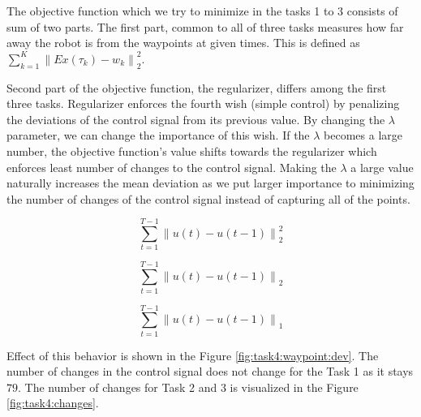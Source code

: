 The objective function which we try to minimize in the tasks 1 to 3 consists of sum of two parts. The first part, common to all of three tasks measures how far away the robot is from the waypoints at given times. This is defined as $\sum_{k = 1}^K \left\| E x( \tau_k ) - w_k \right\|_2^2$. 

Second part of the objective function, the regularizer, differs among the first three tasks. Regularizer enforces the fourth wish (simple control) by penalizing the deviations of the control signal from its previous value. By changing the $\lambda$ parameter, we can change the importance of this wish. If the $\lambda$ becomes a large number, the objective function's value shifts towards the regularizer which enforces least number of changes to the control signal. Making the $\lambda$ a large value naturally increases the mean deviation as we put larger importance to minimizing the number of changes of the control signal instead of capturing all of the points.

\noindent
\begin{minipage}{.33\linewidth}
    \begin{equation}
        \label{task1:regularizer}
        \sum_{t = 1}^{T-1} \left\| u(t) - u(t-1) \right\|_2^2
    \end{equation}
\end{minipage}
\begin{minipage}{.33\linewidth}
    \begin{equation}
        \label{task2:regularizer}
        \sum_{t = 1}^{T-1} \left\| u(t) - u(t-1) \right\|_2
    \end{equation}
\end{minipage}
\begin{minipage}{.33\linewidth}
    \begin{equation}
        \label{task3:regularizer}
        \sum_{t = 1}^{T-1} \left\| u(t) - u(t-1) \right\|_1
    \end{equation}
\end{minipage}

Effect of this behavior is shown in the Figure \ref{fig:task4:waypoint:dev}. The number of changes in the control signal does not change for the Task 1 as it stays $79$. The number of changes for Task 2 and 3 is visualized in the Figure \ref{fig:task4:changes}.


